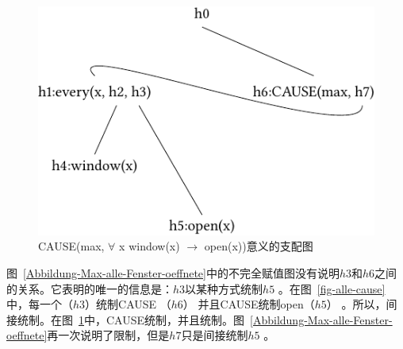 \begin{figure}
\centering

\includegraphics{Figures/solution-mrs-cause-all-open-cropped.pdf}
\caption{CAUSE(max, $\forall$ x window(x) $\to$ open(x))意义的支配图\label{fig-cause-alle}}
\end{figure}%
图~\ref{Abbildung-Max-alle-Fenster-oeffnete}中的不完全赋值图没有说明$h3$和$h6$之间的关系。它表明的唯一的信息是：$h3$以某种方式统制$h5$ 。在图~\ref{fig-alle-cause}中，每一个（$h3$）统制CAUSE （$h6$） 并且CAUSE统制open（$h5$） 。所以，间接统制。在图~\ref{fig-cause-alle}中，CAUSE统制，并且统制。图~\ref{Abbildung-Max-alle-Fenster-oeffnete}再一次说明了限制，但是$h7$只是间接统制$h5$ 。

